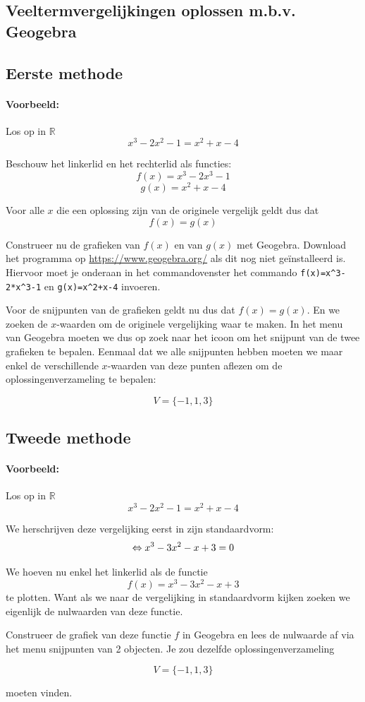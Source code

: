 \documentclass[12pt]{article}
\begin{document}
\begin{theorie}
\pagebreak
\subsection{Veeltermvergelijkingen oplossen m.b.v. Geogebra}

\subsection*{Eerste methode}

\paragraph*{Voorbeeld:} Los op in $\mathbb{R}$
$$x^3-2x^2-1=x^2+x-4$$

Beschouw het linkerlid en het rechterlid als functies:
$$f(x)=x^3-2x^3-1$$
$$g(x)=x^2+x-4$$

Voor alle $x$ die een oplossing zijn van de originele vergelijk geldt dus dat
$$f(x)=g(x)$$

Construeer nu de grafieken van $f(x)$ en van $g(x)$ met Geogebra. Download het programma op \url{https://www.geogebra.org/} als dit nog niet geïnstalleerd is. Hiervoor moet je onderaan in het commandovenster het commando \verb#f(x)=x^3-2*x^3-1# en \verb#g(x)=x^2+x-4# invoeren.

Voor de snijpunten van de grafieken geldt nu dus dat $f(x)=g(x)$. En we zoeken de $x$-waarden om de originele vergelijking waar te maken. In het menu van Geogebra moeten we dus op zoek naar het icoon om het snijpunt van de twee grafieken te bepalen. Eenmaal dat we alle snijpunten hebben moeten we maar enkel de verschillende $x$-waarden van deze punten aflezen om de oplossingenverzameling te bepalen:

$$V=\{-1, 1, 3\}$$

\subsection*{Tweede methode}

\paragraph*{Voorbeeld:} Los op in $\mathbb{R}$
$$x^3-2x^2-1=x^2+x-4$$

We herschrijven deze vergelijking eerst in zijn standaardvorm:
$$\Leftrightarrow x^3-3x^2-x + 3=0$$

We hoeven nu enkel het linkerlid als de functie
$$f(x)=x^3-3x^2-x + 3$$
te plotten. Want als we naar de vergelijking in standaardvorm kijken zoeken we eigenlijk de nulwaarden van deze functie.

Construeer de grafiek van deze functie $f$ in Geogebra en lees de nulwaarde af via het menu snijpunten van 2 objecten. Je zou dezelfde oplossingenverzameling

$$V=\{-1, 1, 3\}$$

moeten vinden.

\end{theorie}
\end{document}
